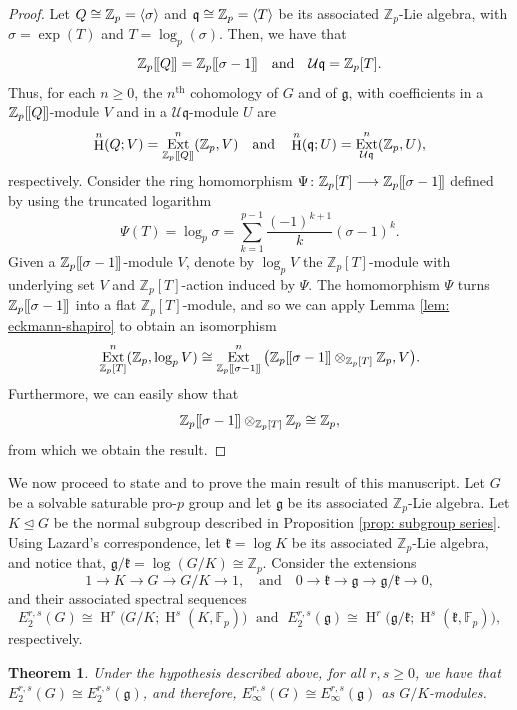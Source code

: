 \documentclass[11pt]{article}
\newcommand{\Z}{\mathbb{Z}}
\newcommand{\Fp}{\mathbb{F}_p}
\newcommand{\Zp}{\mathbb{Z}_p}
\newcommand{\g}{\mathfrak{g}}
\newcommand{\kk}{\mathfrak{k}}
\newcommand{\q}{\mathfrak{q}}
\newcommand{\U}{\mathcal{U}}
\DeclareMathOperator{\HH}{H}
\DeclareMathOperator{\Ext}{Ext}
\newcommand{\isom}{\cong}
\newcommand{\normaleq}{\unlhd}
\DeclarePairedDelimiter{\gen}{\langle}{\rangle}
\DeclarePairedDelimiter{\dbrack}{[\mkern-1.5mu[}{]\mkern-1.5mu]}
\theoremstyle{plain}
\newtheorem{theorem}[lemma]{Theorem}
\theoremstyle{definition}
\begin{document}
	\begin{proof}
	Let $Q\cong\Zp=\gen{\sigma}$ and $\q\cong\Zp=\gen{T}$ be its associated $\Zp$-Lie algebra, with $\sigma=\exp(T)$ and $T=\log_p(\sigma)$. Then, we have that 
\[
		\Zp\dbrack{Q}=\Zp\dbrack{\sigma-1} \quad \text{and} \quad \U\q =\Zp[T].
\]
	Thus, for each $n\geq 0$, the $n^{\text{th}}$ cohomology of $G$ and of $\g$, with coefficients in a $\Zp\dbrack{Q}$-module $V$ and in a $\U\q$-module $U$ are
$$
	\HH^n(Q;V)=\Ext_{\Zp\dbrack{Q}}^n(\Zp,V) \quad \text{and}\quad 
	\HH^n(\q;U)=\Ext_{\U\q}^n(\Zp,U),
$$
	respectively. Consider the ring homomorphism $\Psi\colon \Zp[T]\longrightarrow \Zp\dbrack{\sigma-1}$ defined by using the truncated logarithm 
	\begin{displaymath}
		\Psi(T)=\log_p \sigma=\sum_{k=1}^{p-1}\frac{(-1)^{k+1}}{k}(\sigma-1)^k.
	\end{displaymath}
	Given a $\Zp\dbrack{\sigma-1}$-module $V$, denote by $\log_p V$ the $\Zp[T]$-module with underlying set $V$ and $\Zp[T]$-action induced by $\Psi$. 
	The homomorphism $\Psi$ turns $\Zp\dbrack{\sigma-1}$ into a flat $\Zp[T]$-module, and so we can apply Lemma \ref{lem: eckmann-shapiro} to obtain an isomorphism
	\begin{displaymath}
		\Ext_{\Zp[T]}^n (\Zp,\log_p V)\isom \Ext_{\Zp\dbrack{\sigma-1}}^n\big(\Zp\dbrack{\sigma-1}\otimes_{\Zp[T]} \Zp, V\big).
	\end{displaymath}
	Furthermore, we can easily show that $$\Zp\dbrack{\sigma-1}\otimes_{\Zp[T]} \Zp\isom
	\Zp,$$
	from which we obtain the result.
	\end{proof}


	We now proceed to state and to prove the main result of this manuscript. Let $G$ be a solvable saturable pro-$p$ group and let $\g$ be its associated $\Z_p$-Lie algebra. Let $K\normaleq G$ be the normal subgroup described in Proposition \ref{prop: subgroup series}. Using Lazard's correspondence, let $\kk=\log K$ be its associated $\Z_p$-Lie algebra, and notice that, $\g/\kk=\log (G/K)\cong \Z_p$. Consider the extensions
	\[
	1\to K\to G\to G/K \to 1, \quad \text{and}\quad 0\to \kk \to \g\to \g/\kk\to 0,
	\]
and their associated spectral sequences 
$$
E^{r,s}_2(G)\cong \HH^r\big(G/K;\HH^s(K,\Fp)\big) \; \text{ and  } \; E^{r,s}_2(\g)\cong  \HH^r\big(\g/\kk;\HH^s(\kk,\Fp)\big),
$$
respectively.
	


	
	\begin{theorem}  
		Under the hypothesis described above, for all $r,s\geq 0$, we have that $E^{r,s}_2(G)\cong E_2^{r,s}(\g)$, and therefore, $E^{r,s}_{\infty}(G)\cong E^{r,s}_{\infty}(\g)$ as $G/K$-modules.

	\end{theorem}
	
\end{document}
